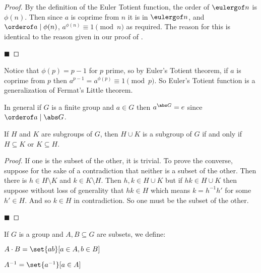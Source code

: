 \begin{proof}

    By the definition of the Euler Totient function, the order of $\eulergof n$ is $\phi(n)$.
    Then since $a$ is coprime from $n$ it is in $\eulergof n$, and $\orderof a\divides\phi(n)$, $a^{\phi(n)}\equiv 1\pmod n$ as required.
    The reason for this is identical to the reason given in our proof of .

    \hfill$\blacksquare$

\end{proof}

Notice that $\phi(p)=p-1$ for $p$ prime, so by Euler's Totient theorem, if $a$ is coprime from $p$ then $a^{p-1}=a^{\phi(p)}\equiv 1\pmod p$.
So Euler's Totient function is a generalization of Fermat's Little theorem.

In general if $G$ is a finite group and $a\in G$ then $a^{\abs G}=e$ since $\orderof a\divides\abs G$.

\begin{prop*}

    If $H$ and $K$ are subgroups of $G$, then $H\cup K$ is a subgroup of $G$ if and only if $H\subseteq K$ or $K\subseteq H$.

\end{prop*}

\begin{proof}

    If one is the subset of the other, it is trivial.
    To prove the converse, suppose for the sake of a contradiction that neither is a subset of the other.
    Then there is $h\in H\setminus K$ and $k\in K\setminus H$.
    Then $h,k\in H\cup K$ but if $hk\in H\cup K$ then suppose without loss of generality that $hk\in H$ which means $k=h^{-1}h'$ for some $h'\in H$.
    And so $k\in H$ in contradiction.
    So one must be the subset of the other.

    \hfill$\blacksquare$

\end{proof}

\begin{defn*}

    If $G$ is a group and $A,B\subseteq G$ are subsets, we define:
    \blist
        \item $A\cdot B=\set{ab}[a\in A, b\in B]$
        \item $A^{-1}=\set{a^{-1}}[a\in A]$
    \elist

\end{defn*}

